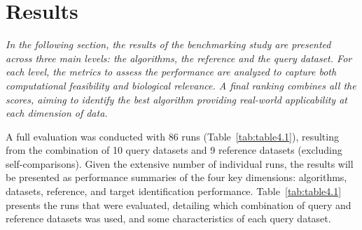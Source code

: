 ﻿%

%


\chapter{Results}
\label{cha:results}

\textit{In the following section, the results of the benchmarking study are presented across three main levels: the algorithms, the reference and the query dataset. For each level, the metrics to assess the performance are analyzed to capture both computational feasibility and biological relevance. A final ranking combines all the scores, aiming to identify the best algorithm providing real-world applicability at each dimension of data.}

A full evaluation was conducted with 86 runs (Table~\ref{tab:table4.1}), resulting from the combination of 10 query datasets and 9 reference datasets (excluding self-comparisons). Given the extensive number of individual runs, the results will be presented as performance summaries of the four key dimensions: algorithms, datasets, reference, and target identification performance. Table~\ref{tab:table4.1} presents the runs that were evaluated, detailing which combination of query and reference datasets was used, and some characteristics of each query dataset.

